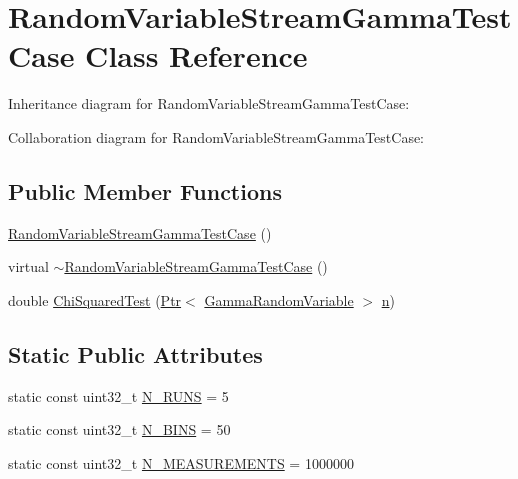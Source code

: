 \hypertarget{classRandomVariableStreamGammaTestCase}{}\section{Random\+Variable\+Stream\+Gamma\+Test\+Case Class Reference}
\label{classRandomVariableStreamGammaTestCase}


Inheritance diagram for Random\+Variable\+Stream\+Gamma\+Test\+Case\+:


Collaboration diagram for Random\+Variable\+Stream\+Gamma\+Test\+Case\+:
\subsection*{Public Member Functions}
\begin{DoxyCompactItemize}
\item 
\hyperlink{classRandomVariableStreamGammaTestCase_ad7e3993ea7474c3e323b3219fbad18de}{Random\+Variable\+Stream\+Gamma\+Test\+Case} ()
\item 
virtual \hyperlink{classRandomVariableStreamGammaTestCase_ae4b67f611de371ddff1f12c17b4976b8}{$\sim$\+Random\+Variable\+Stream\+Gamma\+Test\+Case} ()
\item 
double \hyperlink{classRandomVariableStreamGammaTestCase_a8330d92cb8a848f05abfa4ab429f4ab4}{Chi\+Squared\+Test} (\hyperlink{classns3_1_1Ptr}{Ptr}$<$ \hyperlink{classns3_1_1GammaRandomVariable}{Gamma\+Random\+Variable} $>$ \hyperlink{lte__link__budget__x2__handover__measures_8m_abdb05bc5a064cf642a06c83b3392f148}{n})
\end{DoxyCompactItemize}
\subsection*{Static Public Attributes}
\begin{DoxyCompactItemize}
\item 
static const uint32\+\_\+t \hyperlink{classRandomVariableStreamGammaTestCase_ab9ff0c8326bbfb837ccec51ae309b855}{N\+\_\+\+R\+U\+NS} = 5
\item 
static const uint32\+\_\+t \hyperlink{classRandomVariableStreamGammaTestCase_ab4a9effbc835a0a3ed7925cf79b09c61}{N\+\_\+\+B\+I\+NS} = 50
\item 
static const uint32\+\_\+t \hyperlink{classRandomVariableStreamGammaTestCase_a7a498087c9e38b217f8253981df88c6d}{N\+\_\+\+M\+E\+A\+S\+U\+R\+E\+M\+E\+N\+TS} = 1000000
\end{DoxyCompactItemize}
